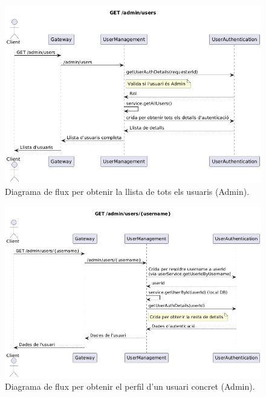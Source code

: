 \begin{figure}[H]
    \centering
    \includegraphics[width=1\textwidth]{Figures/flux/get_users_list.png}
    \caption{Diagrama de flux per obtenir la llista de tots els usuaris (Admin).}
    \label{fig:flow_get_users_list}
\end{figure}

\begin{figure}[H]
    \centering
    \includegraphics[width=1\textwidth]{Figures/flux/get_other_user_info.png}
    \caption{Diagrama de flux per obtenir el perfil d'un usuari concret (Admin).}
    \label{fig:flow_get_other_user_info}
\end{figure}

